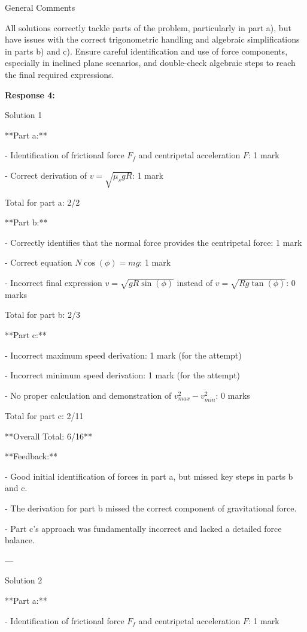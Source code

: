 \documentclass[a4paper,11pt]{article}
\begin{document}
General Comments

All solutions correctly tackle parts of the problem, particularly in part a), but have issues with the correct trigonometric handling and algebraic simplifications in parts b) and c). Ensure careful identification and use of force components, especially in inclined plane scenarios, and double-check algebraic steps to reach the final required expressions.

\bigskip
\textbf{Response 4:}

Solution 1

**Part a:**

- Identification of frictional force \(F_f\) and centripetal acceleration \(F\): 1 mark

- Correct derivation of \(v = \sqrt{\mu_s g R}\): 1 mark

Total for part a: 2/2

**Part b:**

- Correctly identifies that the normal force provides the centripetal force: 1 mark

- Correct equation \(N \cos(\phi) = mg\): 1 mark

- Incorrect final expression \(v = \sqrt{gR\sin(\phi)}\) instead of \(v = \sqrt{Rg\tan(\phi)}\): 0 marks

Total for part b: 2/3

**Part c:**

- Incorrect maximum speed derivation: 1 mark (for the attempt)

- Incorrect minimum speed derivation: 1 mark (for the attempt)

- No proper calculation and demonstration of \(v_{max}^{2} - v_{min}^{2}\): 0 marks

Total for part c: 2/11

**Overall Total: 6/16**

**Feedback:**

- Good initial identification of forces in part a, but missed key steps in parts b and c.

- The derivation for part b missed the correct component of gravitational force.

- Part c's approach was fundamentally incorrect and lacked a detailed force balance.

---

Solution 2

**Part a:**

- Identification of frictional force \(F_f\) and centripetal acceleration \(F\): 1 mark
\end{document}
